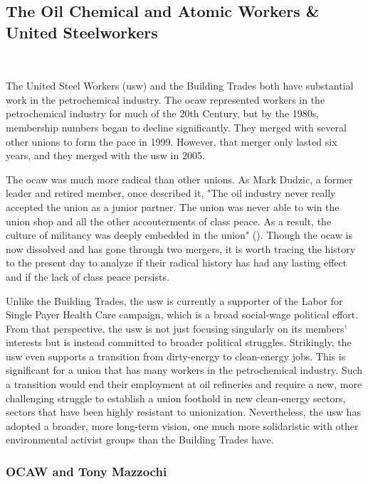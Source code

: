 \documentclass[12pt]{article}
\begin{document}
\subsection{The Oil Chemical and Atomic Workers \& United Steelworkers}\label{ocaw}\

The United Steel Workers (\acrshort{usw}) and the Building Trades both have substantial work in the petrochemical industry. The \acrfull{ocaw} represented workers in the petrochemical industry for much of the 20th Century, but by the 1980s, membership numbers began to decline significantly. They merged with several other unions to form the \acrfull{pace} in 1999. However, that merger only lasted six years, and they merged with the \acrshort{usw} in 2005.

The \acrshort{ocaw} was much more radical than other unions. As Mark Dudzic, a former leader and retired member, once described it, "The oil industry never really accepted the union as a junior partner. The union was never able to win the union shop and all the other accouterments of class peace. As a result, the culture of militancy was deeply embedded in the union" (\cite{leopoldManWhoHated2007}). Though the \acrshort{ocaw} is now dissolved and has gone through two mergers, it is worth tracing the history to the present day to analyze if their radical history has had any lasting effect and if the lack of class peace persists.

Unlike the Building Trades, the \acrshort{usw} is currently a supporter of the Labor for Single Payer Health Care campaign, which is a broad social-wage political effort. From that perspective, the \acrshort{usw} is not just focusing singularly on its members’ interests but is instead committed to broader political struggles. Strikingly, the \acrshort{usw} even supports a transition from dirty-energy to clean-energy jobs. This is significant for a union that has many workers in the petrochemical industry. Such a transition would end their employment at oil refineries and require a new, more challenging struggle to establish a union foothold in new clean-energy sectors, sectors that have been highly resistant to unionization. Nevertheless, the \acrshort{usw} has adopted a broader, more long-term vision, one much more solidaristic with other environmental activist groups than the Building Trades have.

\subsubsection{OCAW and Tony Mazzochi}
\end{document}
